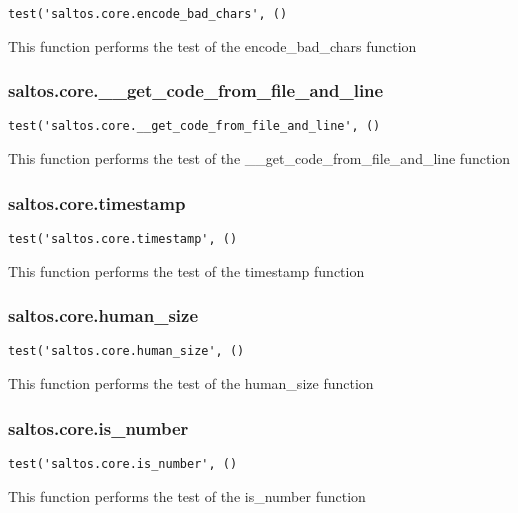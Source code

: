 \documentclass[a4paper]{article}
\begin{document}
\begin{lstlisting}
test('saltos.core.encode_bad_chars', ()
\end{lstlisting}

This function performs the test of the encode\_bad\_chars function

\hypertarget{toc535}{}
\subsubsection{saltos.core.\_\_get\_code\_from\_file\_and\_line}

\begin{lstlisting}
test('saltos.core.__get_code_from_file_and_line', ()
\end{lstlisting}

This function performs the test of the \_\_get\_code\_from\_file\_and\_line function

\hypertarget{toc536}{}
\subsubsection{saltos.core.timestamp}

\begin{lstlisting}
test('saltos.core.timestamp', ()
\end{lstlisting}

This function performs the test of the timestamp function

\hypertarget{toc537}{}
\subsubsection{saltos.core.human\_size}

\begin{lstlisting}
test('saltos.core.human_size', ()
\end{lstlisting}

This function performs the test of the human\_size function

\hypertarget{toc538}{}
\subsubsection{saltos.core.is\_number}

\begin{lstlisting}
test('saltos.core.is_number', ()
\end{lstlisting}

This function performs the test of the is\_number function

\hypertarget{toc539}{}
\end{document}
